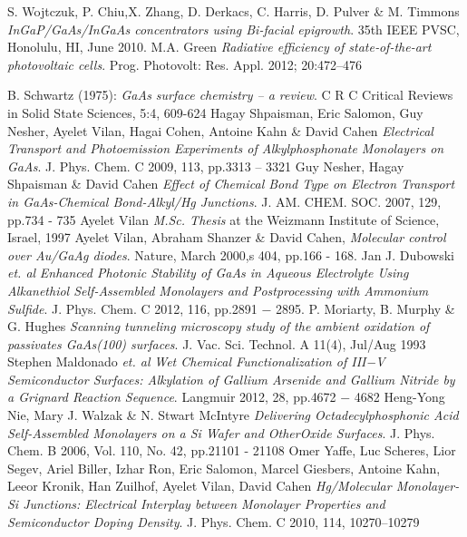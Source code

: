 \documentclass[a4paper]{article}
\begin{document}
\begin{thebibliography}{9}
	S. Wojtczuk, P. Chiu,X. Zhang, D. Derkacs, C. Harris, D. Pulver \& M. Timmons 
	\emph{InGaP/GaAs/InGaAs concentrators using Bi-facial epigrowth}. 
	35th IEEE PVSC, Honolulu, HI, June 2010.
	M.A. Green
	\emph{Radiative efficiency of state‐of‐the‐art photovoltaic cells}.
	Prog. Photovolt: Res. Appl. 2012; 20:472–476

	B. Schwartz (1975): 
	\emph{GaAs surface chemistry – a review}.
	C R C Critical Reviews in Solid State Sciences, 5:4,
609-624
	Hagay Shpaisman, Eric Salomon, Guy Nesher, Ayelet Vilan, Hagai Cohen, Antoine Kahn \& David Cahen
	\emph{Electrical Transport and Photoemission Experiments of Alkylphosphonate Monolayers on GaAs}.
	J. Phys. Chem. C 2009, 113, pp.{3313 – 3321}
	Guy Nesher, Hagay Shpaisman \& David Cahen
	\emph{Effect of Chemical Bond Type on Electron Transport in GaAs-Chemical Bond-Alkyl/Hg Junctions}.
	J. AM. CHEM. SOC. 2007, 129, pp.{734 - 735}
	Ayelet Vilan
	\emph{M.Sc. Thesis}
	at the Weizmann Institute of Science, Israel, 1997
  Ayelet Vilan, Abraham Shanzer \& David Cahen,
  \emph{Molecular control over Au/GaAg diodes}.
  Nature, March 2000,s 404, pp.{166 - 168}.
	Jan J. Dubowski \emph{et. al}
	\emph{Enhanced Photonic Stability of GaAs in Aqueous Electrolyte Using Alkanethiol Self-Assembled Monolayers and Postprocessing with Ammonium Sulfide}.
J. Phys. Chem. C 2012, 116, pp.{2891 − 2895}.
	P. Moriarty, B. Murphy \& G. Hughes
	\emph{Scanning tunneling microscopy study of the ambient oxidation of passivates GaAs(100) surfaces}.
	J. Vac. Sci. Technol. A 11(4), Jul/Aug 1993
	Stephen Maldonado \emph{et. al}
	\emph{Wet Chemical Functionalization of III−V Semiconductor Surfaces: Alkylation of Gallium Arsenide and Gallium Nitride by a Grignard Reaction Sequence}.
	Langmuir 2012, 28, pp.{4672 − 4682}
	Heng-Yong Nie, Mary J. Walzak \& N. Stwart McIntyre
	\emph{Delivering Octadecylphosphonic Acid Self-Assembled Monolayers on a Si Wafer and OtherOxide Surfaces}.
	J. Phys. Chem. B 2006, Vol. 110, No. 42, pp.{21101 - 21108}
	Omer Yaffe, Luc Scheres, Lior Segev, Ariel Biller, Izhar Ron, Eric Salomon, Marcel Giesbers, Antoine Kahn, Leeor Kronik, Han Zuilhof, Ayelet Vilan, David Cahen
	\emph{Hg/Molecular Monolayer-Si Junctions: Electrical Interplay between Monolayer Properties and Semiconductor Doping Density}.
	J. Phys. Chem. C 2010, 114, 10270–10279

\end{thebibliography}
\end{document}
